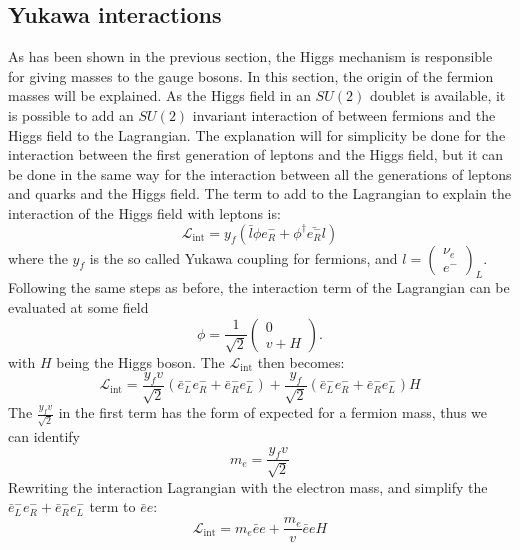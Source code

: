 \subsection*{Yukawa interactions}\label{sec:yukawa}
\noindent\justify
As has been shown in the previous section, the Higgs mechanism is responsible for giving masses to the gauge bosons. In this section, the origin of the fermion masses will be explained.
As the Higgs field in an $SU(2)$ doublet is available, it is possible to add an $SU(2)$ invariant interaction of between fermions and the Higgs field to the Lagrangian. 
The explanation will for simplicity be done for the interaction between the first generation of leptons and the Higgs field, but it can be done in the same way for the interaction between all the generations of leptons and quarks and the Higgs field. 
The term to add to the Lagrangian to explain the interaction of the Higgs field with leptons is:
\begin{equation}
\mathcal{L}_{\mathrm{int}}=y_{f}(\bar{l}\phi e^{-}_{R}+\phi^{\dagger}\bar{e^{-}_{R}}l)
\label{eq:yf}
\end{equation}
where the $y_{f}$ is the so called Yukawa coupling for fermions, and $l=\begin{pmatrix}\nu_{e}  \\ e^{-}\end{pmatrix}_{L}$. 
Following the same steps as before, the interaction term of the Lagrangian can be evaluated at some field  
\begin{equation}
\phi=\frac{1}{\sqrt{2}}\begin{pmatrix} 0  \\ v+H\end{pmatrix}. 
\end{equation}
with $H$ being the Higgs boson. The $\mathcal{L}_{\mathrm{int}}$ then becomes:
\begin{equation}
\mathcal{L}_{\mathrm{int}}=\frac{y_{f}v}{\sqrt{2}}(\bar{e}^{-}_{L}e^{-}_{R}+\bar{e}_{R}^{-}e^{-}_{L})+ \frac{y_{f}}{\sqrt{2}}(\bar{e}^{-}_{L} e^{-}_{R}+\bar{e}_{R}^{-}e^{-}_{L})H
\label{boom}
\end{equation}
The $\frac{y_{f}v}{\sqrt{2}}$ in the first term has the form of expected for a fermion mass, thus we can identify 
\begin{equation}
m_{e}=\frac{y_{f}v}{\sqrt{2}}
\end{equation}
Rewriting the interaction Lagrangian with the electron mass, and simplify the $\bar{e}^{-}_{L}e^{-}_{R}+\bar{e}_{R}^{-}e^{-}_{L}$ term to $\bar{e}e$:
\begin{equation}
\mathcal{L}_{\mathrm{int}}=m_{e}\bar{e}e+ \frac{m_{e}}{v}\bar{e}eH
\end{equation}
